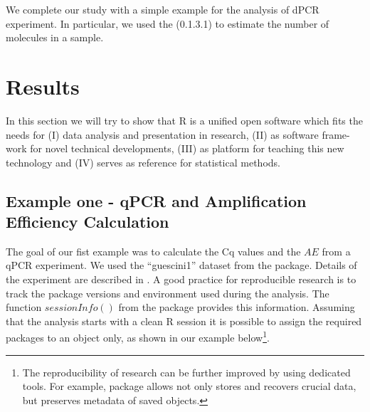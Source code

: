 We complete our study with a simple example for the analysis of dPCR experiment. 
In particular, we used the  (0.1.3.1) to estimate the number of 
molecules in a sample.

\section{Results}

In this section we will try to show that R is a unified open software which fits 
the needs for (I) data analysis and presentation in research, (II) as software 
frame-work for novel technical developments, (III) as platform for teaching this 
new technology and (IV) serves as reference for statistical methods.

\subsection{Example one - qPCR and Amplification Efficiency Calculation}

The goal of our fist example was to calculate the Cq values and the $AE$ from a 
qPCR experiment. We used the ``guescini1'' dataset from the  
package. Details of the experiment are described in \citet{guescini_2008}. A 
good practice for reproducible research is to track the package versions and 
environment used during the analysis. The function $sessionInfo()$ from the 
 package provides this information. Assuming that the analysis 
starts with a clean R session it is possible to assign the required packages to 
an object only, as shown in our example below\footnote{The reproducibility of 
research can be further improved by using dedicated tools. For example, 
 package allows not only stores and recovers crucial data, 
but preserves metadata of saved objects.}.

